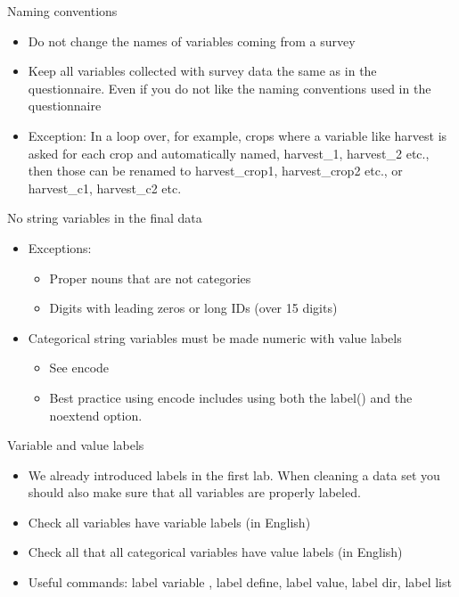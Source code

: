 \documentclass[aspectratio=169]{beamer}
\begin{document}
\begin{frame}{Naming conventions}
	\begin{itemize}
		\item 	Do not change the names of variables coming from a survey
		\item Keep all variables collected with survey data the same as in the questionnaire. Even if you do not like the naming conventions used in the questionnaire
		\item Exception: In a loop over, for example, crops where a variable like harvest is asked for each crop and automatically named, harvest\_1, harvest\_2 etc., then those can be renamed to harvest\_crop1, harvest\_crop2 etc., or harvest\_c1, harvest\_c2 etc.
	\end{itemize}
\end{frame}

\begin{frame}{No string variables in the final data }
	\begin{itemize}
		\item Exceptions:
			\begin{itemize}
					\item Proper nouns that are not categories
					\item Digits with leading zeros or long IDs (over 15 digits)
			\end{itemize}
		\item Categorical string variables must be made numeric with value labels
			\begin{itemize}
				\item See encode
				\item Best practice using encode includes using both the label() and the noextend option.
			\end{itemize}
	\end{itemize}
\end{frame}

\begin{frame}{Variable and value labels }
	\begin{itemize}
		\item We already introduced labels in the first lab. When cleaning a data set you should also make sure that all variables are properly labeled.
		\item Check all variables have variable labels (in English)
		\item Check all that all categorical variables have value labels (in English)
		\item Useful commands: label variable , label define, label value, label dir, label list
	\end{itemize}
\end{frame}
\end{document}
